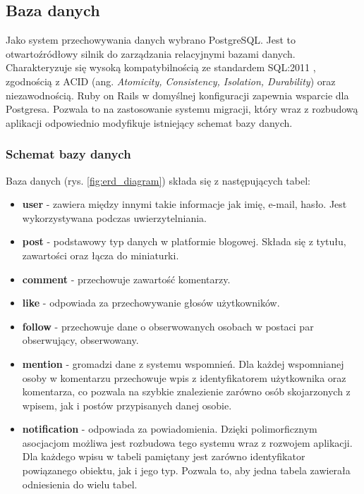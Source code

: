 \documentclass[declaration,shortabstract,polish,inz]{iithesis}
\begin{document}
\subsection{Baza danych}
Jako system przechowywania danych wybrano PostgreSQL. Jest to otwartoźródłowy silnik do zarządzania relacyjnymi bazami danych. Charakteryzuje się wysoką kompatybilnością ze standardem SQL:2011 \cite{sql2011}, zgodnością z ACID \cite{acid} (ang. \textit{Atomicity, Consistency, Isolation, Durability}) oraz niezawodnością. Ruby on Rails w domyślnej konfiguracji zapewnia wsparcie dla Postgresa. Pozwala to na zastosowanie systemu migracji, który wraz z rozbudową aplikacji odpowiednio modyfikuje istniejący schemat bazy danych.


\subsubsection{Schemat bazy danych}
Baza danych (rys. \ref{fig:erd_diagram}) składa się z następujących tabel: 
\begin{itemize}
    \item \textbf{user} - zawiera między innymi takie informacje jak imię, e-mail, hasło. Jest wykorzystywana podczas uwierzytelniania.
    \item \textbf{post} - podstawowy typ danych w platformie blogowej. Składa się z tytułu, zawartości oraz łącza do miniaturki.
    \item \textbf{comment} - przechowuje zawartość komentarzy.
    \item \textbf{like} - odpowiada za przechowywanie głosów użytkowników.
    \item \textbf{follow} - przechowuje dane o obserwowanych osobach w postaci par obserwujący, obserwowany.
    \item \textbf{mention} - gromadzi dane z systemu wspomnień. Dla każdej wspomnianej osoby w komentarzu przechowuje wpis z identyfikatorem użytkownika oraz komentarza, co pozwala na szybkie znalezienie zarówno osób skojarzonych z wpisem, jak i postów przypisanych danej osobie.
    \item \textbf{notification} - odpowiada za powiadomienia. Dzięki polimorficznym asocjacjom możliwa jest rozbudowa tego systemu wraz z rozwojem aplikacji. Dla każdego wpisu w tabeli pamiętany jest zarówno identyfikator powiązanego obiektu, jak i jego typ. Pozwala to, aby jedna tabela zawierała odniesienia do wielu tabel.
\end{itemize}
\end{document}
